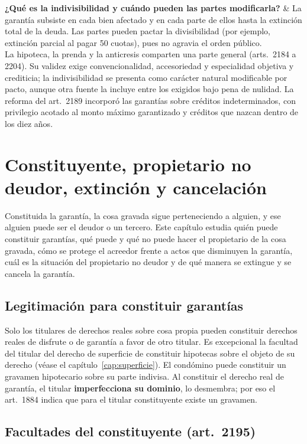 \documentclass[12pt,oneside]{book}
\newcommand{\cq}[2]{\textbf{#1} & #2 \\[0.45em]}
\begin{document}
{\cq{¿Qué es la indivisibilidad y cuándo pueden las partes modificarla?}{La garantía subsiste en cada bien afectado y en cada parte de ellos hasta la extinción total de la deuda. Las partes pueden pactar la divisibilidad (por ejemplo, extinción parcial al pagar 50 cuotas), pues no agravia el orden público.}
}{La hipoteca, la prenda y la anticresis comparten una parte general (arts.~2184 a 2204). Su validez exige convencionalidad, accesoriedad y especialidad objetiva y crediticia; la indivisibilidad se presenta como carácter natural modificable por pacto, aunque otra fuente la incluye entre los exigidos bajo pena de nulidad. La reforma del art.~2189 incorporó las garantías sobre créditos indeterminados, con privilegio acotado al monto máximo garantizado y créditos que nazcan dentro de los diez años.}

\chapter{Constituyente, propietario no deudor, extinción y cancelación}\label{cap:garantias-constituyente}

Constituida la garantía, la cosa gravada sigue perteneciendo a alguien, y ese alguien puede ser el deudor o un tercero. Este capítulo estudia quién puede constituir garantías, qué puede y qué no puede hacer el propietario de la cosa gravada, cómo se protege el acreedor frente a actos que disminuyen la garantía, cuál es la situación del propietario no deudor y de qué manera se extingue y se cancela la garantía.

\section{Legitimación para constituir garantías}

Solo los titulares de derechos reales sobre cosa propia pueden constituir derechos reales de disfrute o de garantía a favor de otro titular. Es excepcional la facultad del titular del derecho de superficie de constituir hipotecas sobre el objeto de su derecho (véase el capítulo~\ref{cap:superficie}). El condómino puede constituir un gravamen hipotecario sobre su parte indivisa. Al constituir el derecho real de garantía, el titular \textbf{imperfecciona su dominio}, lo desmembra; por eso el art.~1884 indica que para el titular constituyente existe un gravamen.

\section{Facultades del constituyente (art.~2195)}
\end{document}
